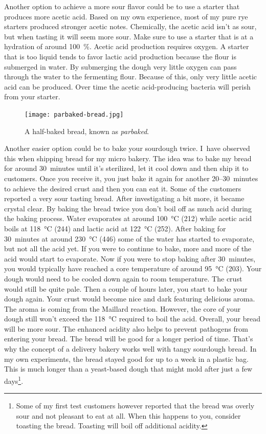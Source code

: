 Another option to achieve a more sour flavor could be to
use a starter that produces more acetic acid. Based on my own
experience, most of my pure rye starters produced stronger acetic
notes. Chemically, the acetic acid isn't as sour, but when tasting
it will seem more sour. Make sure to use a starter that is at
a hydration of around \qty{100}{\percent}. Acetic acid production
requires oxygen. A starter that is too liquid tends to favor lactic
acid production because the flour is submerged in water. By submerging
the dough very little oxygen can pass through the water to the fermenting flour.
Because of this, only very little acetic acid can be produced. Over
time the acetic acid-producing bacteria will perish from your starter.

\begin{figure}[!htb]
  \texttt{[image: parbaked-bread.jpg]}
  \caption[Half-baked bread]{A half-baked bread, known as \emph{parbaked}.}%
  \label{fig:parbaked-bread}
\end{figure}

Another easier option could be to bake your sourdough
twice. I~have observed this when shipping bread for my micro
bakery. The idea was to bake my bread for around 30~minutes
until it's sterilized, let it cool down and then ship it
to customers. Once you receive it, you just bake it again
for another 20--30~minutes to achieve the desired crust and
then you can eat it. Some of the customers reported a very sour
tasting bread. After investigating a bit more, it became
crystal clear. By baking the bread twice you don't boil off
as much acid during the baking process. Water
evaporates at around \qty{100}{\degreeCelsius} (\qty{212}{\degF}) while acetic
acid boils at \qty{118}{\degreeCelsius} (\qty{244}{\degF}) and lactic acid at
\qty{122}{\degreeCelsius} (\qty{252}{\degF}). After baking for 30~minutes at
around  \qty{230}{\degreeCelsius} (\qty{446}{\degF}) some of the water has
started to evaporate, but not all the acid yet. If you were to continue to
bake, more and more of the acid would start to evaporate. Now if you were to
stop baking after 30~minutes, you would typically have reached a core
temperature of around \qty{95}{\degreeCelsius} (\qty{203}{\degF}).  Your dough
would need
to be cooled down again to room temperature. The crust would
still be quite pale. Then a couple of hours later, you start
to bake your dough again. Your crust would become nice and
dark featuring delicious aroma. The aroma is coming from the
Maillard reaction. However, the core of your dough still won't
exceed the \qty{118}{\degreeCelsius} required to boil the acid. Overall, your
bread will be more sour. The enhanced acidity also helps
to prevent pathogens from entering your bread. The bread
will be good for a longer period of time. That's why
the concept of a delivery bakery works well with tangy sourdough bread.
In my own experiments, the bread stayed good for up to a week
in a plastic bag. This is much longer than a yeast-based dough that might
mold after just a few days\footnote{Some of my first test customers however
reported that the bread was overly sour and not pleasant to eat at all.
When this happens to you, consider toasting the bread. Toasting
will boil off additional acidity.}.

